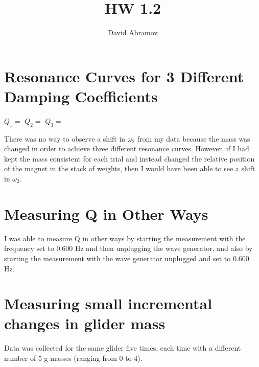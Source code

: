 \documentclass[11pt, oneside]{article}   	%
\title{HW 1.2}
\author{David Abramov}
\begin{document}
\maketitle

\section{Resonance Curves for 3 Different Damping Coefficients}

$Q_{1}=$
$Q_{2}=$
$Q_{3}=$

There was no way to observe a shift in $\omega_{2}$ from my data because the mass was changed in order to achieve three different resonance curves. However, if I had kept the mass consistent for each trial and instead changed the relative position of the magnet in the stack of weights, then I would have been able to see a shift in $\omega_{2}$.  



\section{Measuring Q in Other Ways}

I was able to measure Q in other ways by starting the measurement with the frequency set to $0.600$ Hz and then unplugging the wave generator, and also by starting the measurement with the wave generator unplugged and set to 0.600 Hz.

\section{Measuring small incremental changes in glider mass}

Data was collected for the same glider five times, each time with a different number of 5 g masses (ranging from 0 to 4).
\end{document}
